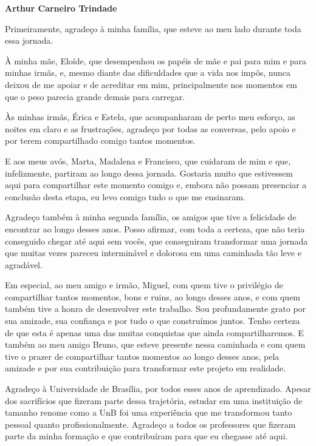 \begin{agradecimentos}

\begin{center}
\textbf{Arthur Carneiro Trindade}
\end{center}

Primeiramente, agradeço à minha família, que esteve ao meu lado durante toda essa jornada.

À minha mãe, Eloíde, que desempenhou os papéis de mãe e pai para mim e para minhas irmãs, e, mesmo diante das dificuldades que a vida nos impôs, nunca deixou de me apoiar e de acreditar em mim, principalmente nos momentos em que o peso parecia grande demais para carregar.

Às minhas irmãs, Érica e Estela, que acompanharam de perto meu esforço, as noites em claro e as frustrações, agradeço por todas as conversas, pelo apoio e por terem compartilhado comigo tantos momentos.

E aos meus avós, Marta, Madalena e Francisco, que cuidaram de mim e que, infelizmente, partiram ao longo dessa jornada. Gostaria muito que estivessem aqui para compartilhar este momento comigo e, embora não possam presenciar a conclusão desta etapa, eu levo comigo tudo o que me ensinaram.

Agradeço também à minha segunda família, os amigos que tive a felicidade de encontrar ao longo desses anos. Posso afirmar, com toda a certeza, que não teria conseguido chegar até aqui sem vocês, que conseguiram transformar uma jornada que muitas vezes pareceu interminável e dolorosa em uma caminhada tão leve e agradável.

Em especial, ao meu amigo e irmão, Miguel, com quem tive o privilégio de compartilhar tantos momentos, bons e ruins, ao longo desses anos, e com quem também tive a honra de desenvolver este trabalho. Sou profundamente grato por sua amizade, sua confiança e por tudo o que construímos juntos. Tenho certeza de que esta é apenas uma das muitas conquistas que ainda compartilharemos. E também ao meu amigo Bruno, que esteve presente nessa caminhada e com quem tive o prazer de compartilhar tantos momentos ao longo desses anos, pela amizade e por sua contribuição para transformar este projeto em realidade.

Agradeço à Universidade de Brasília, por todos esses anos de aprendizado. Apesar dos sacrifícios que fizeram parte dessa trajetória, estudar em uma instituição de tamanho renome como a UnB foi uma experiência que me transformou tanto pessoal quanto profissionalmente. Agradeço a todos os professores que fizeram parte da minha formação e que contribuíram para que eu chegasse até aqui.


\end{agradecimentos}
